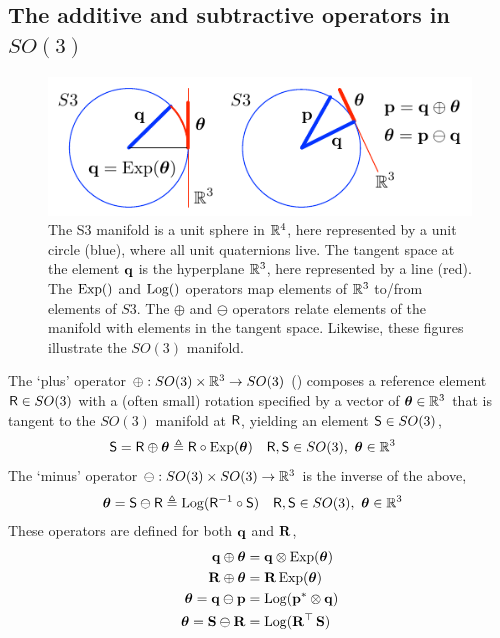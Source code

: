 \subsection{The additive and subtractive operators in $SO(3)$}

\begin{figure}[tb]
\begin{center}
\includegraphics{figures/manifold}
\caption{The S3 manifold is a unit sphere in ${\mathbb R}^4$, here represented by a unit circle (blue),  where all unit quaternions live. The tangent space at the element ${\bf q}$ is the hyperplane ${\mathbb R}^3$, here represented by a line (red). The $\operatorname*{Exp}()$ and $\operatorname*{Log}()$ operators map elements of ${\mathbb R}^3$ to/from elements of $S3$. The $\oplus$ and $\ominus$ operators relate elements of the manifold with elements in the tangent space. Likewise, these figures illustrate the $SO(3)$ manifold.}
\label{fig:manifold}
\end{center}
\end{figure}




The `plus' operator $\oplus:SO(3)\times{\mathbb R}^3\to SO(3)$ () composes a reference element $\mathsf R\in SO(3)$ with a (often small) rotation specified by a vector of ${{\bm \theta}}\in{\mathbb R}^3$ that is tangent to the $SO(3)$ manifold at $\mathsf R$, yielding an element $\mathsf S\in SO(3)$, 
%
\begin{align*}
\mathsf S = \mathsf R\oplus {{\bm \theta}} &\triangleq \mathsf R\circ\operatorname*{Exp}({{\bm \theta}}) && \mathsf R,\mathsf S\in SO(3),~ {{\bm \theta}}\in{\mathbb R}^3 
\end{align*}
%
The `minus' operator $\ominus:SO(3)\times SO(3)\to{\mathbb R}^3$ is the inverse of the above,
%
\begin{align*}
{{\bm \theta}}=\mathsf S\ominus \mathsf R
&\triangleq \operatorname*{Log}(\mathsf R^{-1} \circ \mathsf S)     && \mathsf R,\mathsf S\in SO(3),~ {{\bm \theta}}\in{\mathbb R}^3  
\end{align*}
%
These operators are defined for both ${\bf q}$ and ${\bf R}$,
%
\begin{align}
{\bf q}\oplus{{\bm \theta}}  &= {\bf q}\otimes\operatorname*{Exp}({{\bm \theta}}) \\
{\bf R}\oplus {{\bm \theta}} &= {\bf R}\operatorname*{Exp}({{\bm \theta}}) \\
{{\bm \theta}} = {\bf q}\ominus{\bf p} &= \operatorname*{Log}({\bf p}^*\otimes{\bf q}) \\
{{\bm \theta}} = {\bf S}\ominus{\bf R} &= \operatorname*{Log}({\bf R}^{\top}\,{\bf S})                         
\end{align}



